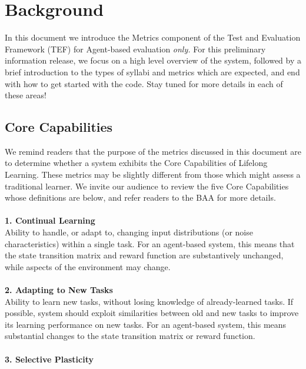 \chapter{Background}\label{ch:background}

In this document we introduce the Metrics component of the Test and Evaluation Framework (TEF) for Agent-based evaluation \textit{only.} For this preliminary information release, we focus on a high level overview of the system, followed by a brief introduction to the types of syllabi and metrics which are expected, and end with how to get started with the code. Stay tuned for more details in each of these areas!

\section{Core Capabilities}
\label{sec:core_capabilities}

We remind readers that the purpose of the metrics discussed in this document are to determine whether a system exhibits the Core Capabilities of Lifelong Learning. These metrics may be slightly different from those which might assess a traditional learner. We invite our audience to review the five Core Capabilities whose definitions are below, and refer readers to the BAA for more details.\\%
\\
\textbf{1. Continual Learning}\\

Ability to handle, or adapt to, changing input distributions (or noise characteristics) within a single task. For an agent-based system, this means that the state transition matrix and reward function are substantively unchanged, while aspects of the environment may change.\\
\\
\textbf{2. Adapting to New Tasks}\\

Ability to learn new tasks, without losing knowledge of already-learned tasks. If possible, system should exploit similarities between old and new tasks to improve its learning performance on new tasks. For an agent-based system, this means substantial changes to the state transition matrix or reward function.\\
\\
\textbf{3. Selective Plasticity}\\

